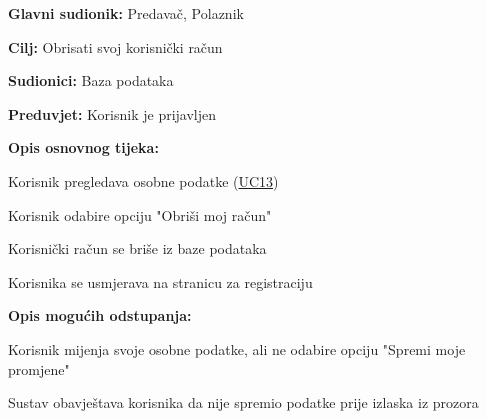 			\begin{packed_item}
				
				\item \textbf{Glavni sudionik:} Predavač, Polaznik
				\item  \textbf{Cilj:} Obrisati svoj korisnički račun
				\item  \textbf{Sudionici:} Baza podataka
				\item  \textbf{Preduvjet:} Korisnik je prijavljen
				\item  \textbf{Opis osnovnog tijeka:}
				
				\item[] \begin{packed_enum}
					
					\item Korisnik pregledava osobne podatke (\hyperref[UC13] {UC13})
					\item Korisnik odabire opciju "Obriši moj račun"
					\item Korisnički račun se briše iz baze podataka
					\item Korisnika se usmjerava na stranicu za registraciju
					
				\end{packed_enum}
				\item  \textbf{Opis mogućih odstupanja:}
				
				\item[] \begin{packed_item}
					
					\item[2.a] Korisnik mijenja svoje osobne podatke, ali ne odabire opciju "Spremi moje promjene"
					\item[] \begin{packed_enum}
						
						\item Sustav obavještava korisnika da nije spremio podatke prije izlaska iz prozora
						
					\end{packed_enum}
					
				\end{packed_item}
				
			\end{packed_item}
					\noindent {}
